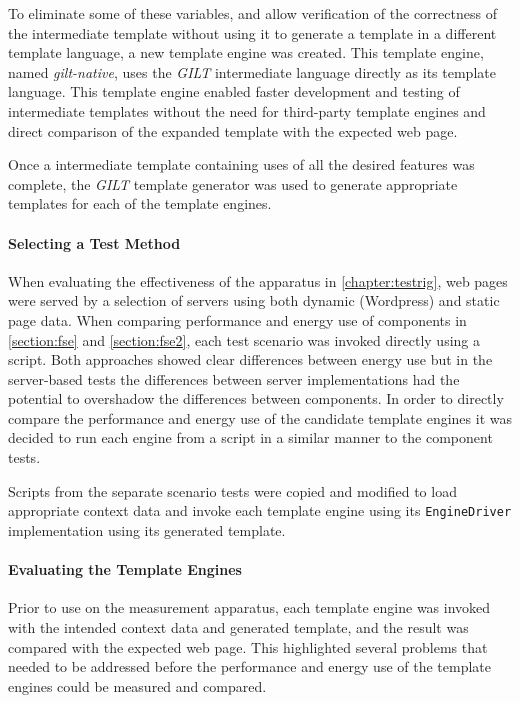 To eliminate some of these variables, and allow verification of the correctness of the intermediate template without using it to generate a template in a different \gls{template language}, a new \gls{template engine} was created. This \gls{template engine}, named \emph{gilt-native}, uses the \emph{GILT} intermediate language directly as its \gls{template language}. This \gls{template engine} enabled faster development and testing of intermediate templates without the need for third-party \gls{template engine}s and direct comparison of the expanded template with the expected web page. 

Once a intermediate template containing uses of all the desired features was complete, the \emph{GILT} template generator was used to generate appropriate templates for each of the \gls{template engine}s.

\paragraph{Selecting a Test Method}
\label{cce method}

When evaluating the effectiveness of the apparatus in \autoref{chapter:testrig}, web pages were served by a selection of servers using both dynamic (Wordpress) and static page data. When comparing performance and energy use of components in \autoref{section:fse} and \autoref{section:fse2}, each test scenario was invoked directly using a script. Both approaches showed clear differences between energy use but in the server-based tests the differences between server implementations had the potential to overshadow the differences between components. In order to directly compare the performance and energy use of the candidate \gls{template engine}s it was decided to run each engine from a script in a similar manner to the component tests.

Scripts from the separate scenario tests were copied and modified to load appropriate context data and invoke each \gls{template engine} using its \verb!EngineDriver! implementation using its generated template.

\paragraph{Evaluating the Template Engines}
\label{cce evaluation}

Prior to use on the measurement apparatus, each \gls{template engine} was invoked with the intended context data and generated template, and the result was compared with the expected web page. This highlighted several problems that needed to be addressed before the performance and energy use of the \gls{template engine}s could be measured and compared.

